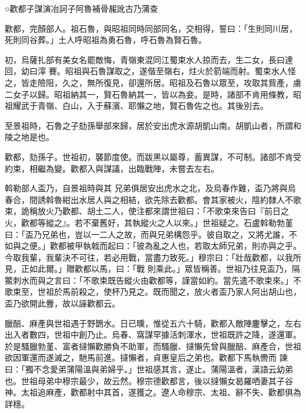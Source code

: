 
\begin{pinyinscope}

 ○歡都子謀演冶訶子阿魯補骨赧訛古乃蒲查



 歡都，完顏部人。祖石魯，與昭祖同時同部同名，交相得，誓曰：「生則同川居，死則同谷葬。」土人呼昭祖為勇石魯，呼石魯為賢石魯。



 初，烏薩扎部有美女名罷敵悔，青嶺東混同江蜀束水人掠而去，生二女，長曰達回，幼曰滓
 賽。昭祖與石魯謀取之，遂偕至嶺右，炷火於箭端而射。蜀束水人怪之，皆走險阻，久之，無所復見，卻還所居。昭祖及石魯以眾至，攻取其貲產，虜二女子以歸。昭祖納其一，賢石魯納其一，皆以為妾。是時，諸部不肯用條教，昭祖耀武于青嶺、白山，入于蘇濱、耶懶之地，賢石魯佐之也。其後別去。



 至景祖時，石魯之子劾孫舉部來歸，居於安出虎水源胡凱山南。胡凱山者，所謂和陵之地是也。



 歡都，劾孫子。世祖初，襲節度使。而跋黑以屬尊，蓄異謀，不可制。諸部不肯受約束，相繼為變。歡都入與謀議，出臨戰陣，未嘗去左右。



 斡勒部人盃乃，自景祖時與其
 兄弟俱居安出虎水之北，及烏春作難，盃乃將與烏春合，間誘斡魯紺出水居人與之相結，欲先除去歡都。會其家被火，陰約隸人不歌束，詭稱放火乃歡都、胡土二人，使注都來謂世祖曰：「不歌束來告曰『前日之火，歡都等縱之』。若不棄舊好，其執縱火之人以來。」世祖疑之。石盧斡勒勃堇曰：「盃乃兄弟也，豈以一二人之故，而與兄弟構怨乎。彼自取之，又將尤誰，不如與之便。」歡都被甲執戟而起曰：「彼為亂之人也，若取太師兄弟，則亦與之乎。今取我輩，我輩決不可往，若必用戰，當盡力致死。」穆宗曰：「壯哉歡都，以我所見，正如此爾。」贈歡都以馬，曰：「戰
 則乘此。」眾皆稱善。世祖乃往見盃乃，隔鱉刺水而與之言曰：「不歌束既告縱火由歡都等，謹當如約。當先遣不歌束來。」不歌束至，世祖於馬前殺之，使杯乃見之。既而聞之，放火者盃乃家人阿出胡山也，盃乃欲開此釁，故以誣歡都云。



 臘醅、麻產與世祖遇于野鵲水。日已曛，惟從五六十騎，歡都入敵陣鏖擊之，左右出入者數四，世祖中創乃止。烏春、窩謀罕據活刺渾水，世祖既許之降，遂還軍。於是騷臘勃堇、富者撻懶歡勝負不助軍，而騷臘、撻懶先曾與臘醅、麻產合，世祖欲因軍還而遂滅之，馳馬前進。撻懶者，貞惠皇后之弟也。歡都下馬執轡而
 諫曰：「獨不念愛弟蒲陽溫與弟婦乎。」世祖感其言，遂止。蒲陽溫者，漢語云幼弟也。世祖母弟中穆宗最少，故云然。穆宗德歡都言，後以撻懶女曷羅哂妻其子谷神。太祖追麻產，歡都射中其首，遂獲之。遼人命穆宗、太祖、辭不失、歡都俱為詳穩。




\end{pinyinscope}
